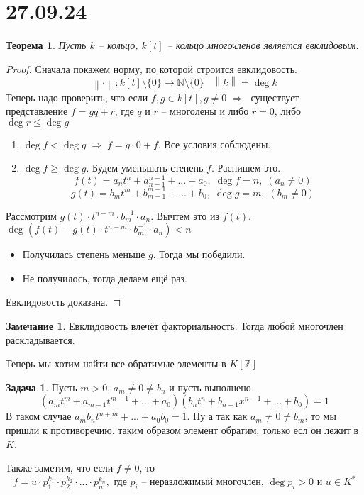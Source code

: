 \documentclass[12pt, a4paper]{article}
\newcommand{\nat}{\mathds{N}}
\newcommand{\ra}{\;\Rightarrow\;}
\newcommand{\Z}{\mathds{Z}}
\newcommand{\m}{\leqslant}
\newcommand{\bo}{\geqslant}
\newcommand{\norm}[1]{\left \lVert #1 \right \rVert}
\theoremstyle{plain}
\newtheorem*{Th*}{Теорема}
\theoremstyle{definition}
\newtheorem*{Remark*}{Замечание}
\newtheorem*{Problem*}{Задача}
\begin{document}
\section*{27.09.24}
\hypertarget{p8}{}
\begin{Th*}
    Пусть $k$ -- кольцо, $k[t]$ -- кольцо многочленов является евклидовым.
\end{Th*}
\begin{proof}
    Сначала покажем норму, по которой строится евклидовость.
    \[\norm{\cdot}:k[t]\setminus\{0\}\to\nat\setminus\{0\}\;\;\;\norm{k} = \deg k\]
    Теперь надо проверить, что если $f,g\in k[t], g\neq 0\ra$ существует представление $f = gq+r$, где $q$ и $r$ -- многолены и либо $r = 0$, либо $\deg r \m \deg g$
    \begin{enumerate}
        \item $\deg f < \deg g \ra f = g\cdot 0 + f$. Все условия соблюдены.
        \item $\deg f \bo \deg g$. Будем уменьшать степень $f$. Распишем это.
        \[f(t) = a_nt^n+a_{n-1}^{n-1}+...+a_0,\; \deg f = n,\; (a_n\neq 0)\]
        \[g(t) = b_mt^m+b_{m-1}^{m-1}+...+b_0,\; \deg g = m,\; (b_m\neq 0)\]

    \end{enumerate}
Рассмотрим $g(t)\cdot t^{n-m}\cdot b_m^{-1}\cdot a_n$. Вычтем это из $f(t)$. $\deg(f(t)-g(t)\cdot t^{n-m}\cdot b_m^{-1}\cdot a_n)<n$
\begin{itemize}
    \item Получилась степень меньше $g$. Тогда мы победили.
    \item Не получилось, тогда делаем ещё раз.
\end{itemize}
Евклидовость доказана.
\end{proof}
\begin{Remark*}
    Евклидовость влечёт факториальность. Тогда любой многочлен раскладывается.
\end{Remark*}
\noindent Теперь мы хотим найти все обратимые элементы в $K[\Z]$
\begin{Problem*}
    Пусть $m>0$, $a_m\neq 0\neq b_n$ и пусть выполнено
    \[(a_mt^m+a_{m-1}t^{m-1}+...+a_0)(b_nt^n+b_{n-1}x^{n-1}+...+b_0) = 1\]
    В таком случае $a_mb_nt^{n+m}+...+a_0b_0 = 1$. Ну а так как $a_m\neq 0 \neq b_m$, то мы пришли к противоречию. 
    таким образом элемент обратим, только есл он лежит в $K$.
\end{Problem*}
\noindent Также заметим, что если $f\neq 0$, то 
\[f = u\cdot p_1^{k_1}\cdot p_2^{k_2}\cdot...\cdot p_n^{k_n}, \text{ где } p_i \text{ -- неразложимый многочлен, } \deg p_i>0 \text{ и } u\in K^{*}\]
\end{document}
